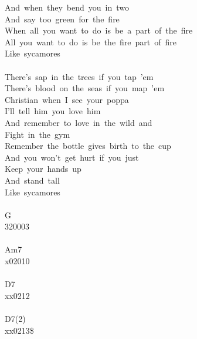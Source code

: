 {And\ when\ they\ bend\ you\ in\ two\\
And\ say\ too\ green\ for\ the\ fire\\
When\ all\ you\ want\ to\ do\ is\ be\ a\ part\ of\ the\ fire\\
All\ you\ want\ to\ do\ is\ be\ the\ fire\ part\ of\ fire\\
Like\ sycamores\\
\\
There's\ sap\ in\ the\ trees\ if\ you\ tap\ 'em\\
There's\ blood\ on\ the\ seas\ if\ you\ map\ 'em\\
Christian\ when\ I\ see\ your\ poppa\\
I'll\ tell\ him\ you\ love\ him\\
And\ remember\ to\ love\ in\ the\ wild\ and\\
Fight\ in\ the\ gym\\
Remember\ the\ bottle\ gives\ birth\ to\ the\ cup\\
And\ you\ won't\ get\ hurt\ if\ you\ just\\
Keep\ your\ hands\ up\\
And\ stand\ tall\\
Like\ sycamores\\
\\
G\\
320003\\
\\
Am7\\
x02010\\
\\
D7\\
xx0212\\
\\
D7(2)\\
xx0213\$}
